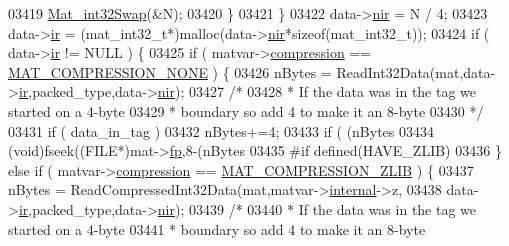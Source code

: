 \begin{DoxyCode}
{{{{{{{{{{{{{{{{{{03419                         \hyperlink{endian_8c_a2e0153996243f0a34df9a5286087cfa3}{Mat\_int32Swap}(&N);
03420                 \}
03421             \}
03422             data->\hyperlink{group___m_a_t_aa64636ad57cf87f7a28ff5018437a850}{nir} = N / 4;
03423             data->\hyperlink{group___m_a_t_a8d4c863d704edddec5cbfa15b2d719c8}{ir} = (mat\_int32\_t*)malloc(data->\hyperlink{group___m_a_t_aa64636ad57cf87f7a28ff5018437a850}{nir}*\textcolor{keyword}{sizeof}(mat\_int32\_t));
03424             \textcolor{keywordflow}{if} ( data->\hyperlink{group___m_a_t_a8d4c863d704edddec5cbfa15b2d719c8}{ir} != NULL ) \{
03425                 \textcolor{keywordflow}{if} ( matvar->\hyperlink{group___m_a_t_aeef0466048621cb2c959ba7f6c774d06}{compression} == \hyperlink{group___m_a_t_gga768c318af97bd2567758ecb001ceb7f4a2280b97631ff5dd24dec55261dc587b6}{MAT\_COMPRESSION\_NONE} ) \{
03426                     nBytes = ReadInt32Data(mat,data->\hyperlink{group___m_a_t_a8d4c863d704edddec5cbfa15b2d719c8}{ir},packed\_type,data->\hyperlink{group___m_a_t_aa64636ad57cf87f7a28ff5018437a850}{nir});
03427                     \textcolor{comment}{/*}
03428 \textcolor{comment}{                     * If the data was in the tag we started on a 4-byte}
03429 \textcolor{comment}{                     * boundary so add 4 to make it an 8-byte}
03430 \textcolor{comment}{                     */}
03431                     \textcolor{keywordflow}{if} ( data\_in\_tag )
03432                         nBytes+=4;
03433                     \textcolor{keywordflow}{if} ( (nBytes %
03434                         (void)fseek((FILE*)mat->\hyperlink{struct__mat__t_a85f562e407ca9ad4d2a6e14f839432b7}{fp},8-(nBytes %
03435 \textcolor{preprocessor}{#if defined(HAVE\_ZLIB)}
03436                 \} \textcolor{keywordflow}{else} \textcolor{keywordflow}{if} ( matvar->\hyperlink{group___m_a_t_aeef0466048621cb2c959ba7f6c774d06}{compression} == 
      \hyperlink{group___m_a_t_gga768c318af97bd2567758ecb001ceb7f4a5181d2f71eab0f12f05ba65d4f13fb53}{MAT\_COMPRESSION\_ZLIB} ) \{
03437                     nBytes = ReadCompressedInt32Data(mat,matvar->\hyperlink{group___m_a_t_a6e97e3ed9f40c49322c18561c2a94e92}{internal}->z,
03438                                  data->\hyperlink{group___m_a_t_a8d4c863d704edddec5cbfa15b2d719c8}{ir},packed\_type,data->\hyperlink{group___m_a_t_aa64636ad57cf87f7a28ff5018437a850}{nir});
03439                     \textcolor{comment}{/*}
03440 \textcolor{comment}{                     * If the data was in the tag we started on a 4-byte}
03441 \textcolor{comment}{                     * boundary so add 4 to make it an 8-byte}
}}}}}}}}}}}}}}}}}}
\end{DoxyCode}
